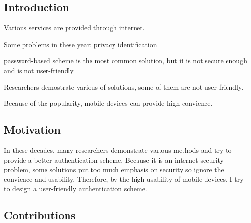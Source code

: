 
\begin{CJK}{Bg5}{bsmi}



\chapter{Introduction}

Various services are provided through internet.

Some problems in these year:
	privacy
	identification

password-based scheme is the most common solution, but it is not secure enough and is not user-friendly



Researchers demostrate various of solutions, some of them are not user-friendly.

Because of the popularity, mobile devices can provide high convience.

\begin{comment}
In the age of information, more and more services are provided through the internet. Thought it brings us a convient daily life, there are some problems emerge. First, the convience of internet make the bondaries between people blur. Therefore, it is an important issue about how to protect our privacy.
The second problem is that
\end{comment}

\section{Motivation}

In these decades, many researchers demonstrate various methods and try to provide a better authentication scheme. Because it is an internet security problem, some solutions put too much emphasis on security so ignore the convience and usability. Therefore, by the high usability of mobile devices, I try to design a user-friendly authentication scheme.


\begin{comment}
As authentication system is an important part in the world of internet. A good authentication system may protect everyone's privacy not be invaded by the malicious person. 
So far, because of the easy design, the password-based scheme is the most common solution about authentication issue. However, there were some researches demontrates that this was not a proper solution in both security and usability. 
\end{comment}


\section{Contributions}

\end{CJK}
